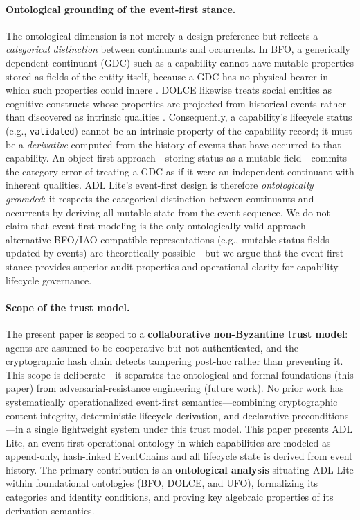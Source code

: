 \paragraph{Ontological grounding of the event-first stance.} The ontological dimension is not merely a design preference but reflects a \emph{categorical distinction} between continuants and occurrents. In BFO, a generically dependent continuant (GDC) such as a capability cannot have mutable properties stored as fields of the entity itself, because a GDC has no physical bearer in which such properties could inhere \cite{bfo}. DOLCE likewise treats social entities as cognitive constructs whose properties are projected from historical events rather than discovered as intrinsic qualities \cite{dolce}. Consequently, a capability's lifecycle status (e.g., \texttt{validated}) cannot be an intrinsic property of the capability record; it must be a \emph{derivative} computed from the history of events that have occurred to that capability. An object-first approach---storing status as a mutable field---commits the category error of treating a GDC as if it were an independent continuant with inherent qualities. ADL Lite's event-first design is therefore \emph{ontologically grounded}: it respects the categorical distinction between continuants and occurrents by deriving all mutable state from the event sequence. We do not claim that event-first modeling is the only ontologically valid approach---alternative BFO/IAO-compatible representations (e.g., mutable status fields updated by events) are theoretically possible---but we argue that the event-first stance provides superior audit properties and operational clarity for capability-lifecycle governance.

\paragraph{Scope of the trust model.} The present paper is scoped to a \textbf{collaborative non-Byzantine trust model}: agents are assumed to be cooperative but not authenticated, and the cryptographic hash chain detects tampering post-hoc rather than preventing it. This scope is deliberate---it separates the ontological and formal foundations (this paper) from adversarial-resistance engineering (future work). No prior work has systematically operationalized event-first semantics---combining cryptographic content integrity, deterministic lifecycle derivation, and declarative preconditions---in a single lightweight system under this trust model. This paper presents ADL Lite, an event-first operational ontology in which capabilities are modeled as append-only, hash-linked EventChains and all lifecycle state is derived from event history. The primary contribution is an \textbf{ontological analysis} situating ADL Lite within foundational ontologies (BFO, DOLCE, and UFO), formalizing its categories and identity conditions, and proving key algebraic properties of its derivation semantics.

